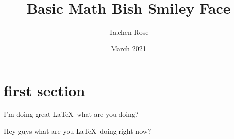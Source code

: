 \documentclass{article}
\title{Basic Math Bish Smiley Face}
\author{Taichen Rose}
\date{March 2021}
\begin{document}
\section{first section}

I'm doing great \LaTeX\ what are you doing?

Hey guys what are you \LaTeX\ doing right now?
\end{document}
